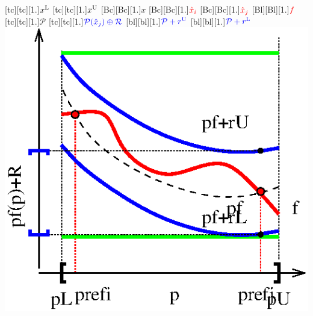 \documentclass[a4paper,12pt]{article}
\begin{document}
[tc][tc][1.]{$x^{\rm L}$}
[tc][tc][1.]{$x^{\rm U}$}
[Bc][Bc][1.]{$x$}
[Bc][Bc][1.]{$\color{red}\hat{x}_i$}
[Bc][Bc][1.]{$\color{red}\hat{x}_j$}
[Bl][Bl][1.]{$\color{red}f$}
[tc][tc][1.]{$\mathcal P$}
[tc][tc][1.]{$\color{blue}\mathcal P(\hat x_j)\oplus\mathcal R$}
[bl][bl][1.]{$\color{blue}\mathcal P+r^{\rm U}$}
[bl][bl][1.]{$\color{blue}\mathcal P+r^{\rm L}$}
\includegraphics[width=.45\textwidth]{Chebyshevmodel.eps}
\end{document}
